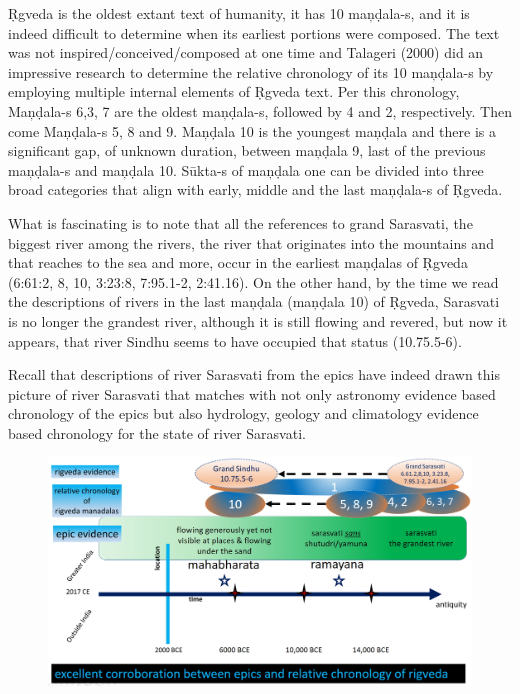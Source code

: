 Ṛgveda is the oldest extant text of humanity, it has 10 maņḍala-s, and it is indeed difficult to determine when its earliest portions were composed. The text was not inspired/conceived/composed at one time and Talageri (2000) did an impressive research to determine the relative chronology of its 10 maņḍala-s by employing multiple internal elements of Ṛgveda text. Per this chronology, Maņḍala-s 6,3, 7 are the oldest maņḍala-s, followed by 4 and 2, respectively. Then come Maņḍala-s 5, 8 and 9. Maņḍala 10 is the youngest maņḍala and there is a significant gap, of unknown duration, between maņḍala 9, last of the previous maņḍala-s and maņḍala 10. Sūkta-s of maņḍala one can be divided into three broad categories that align with early, middle and the last maņḍala-s of Ṛgveda.

What is fascinating is to note that all the references to grand Sarasvati, the biggest river among the rivers, the river that originates into the mountains and that reaches to the sea and more, occur in the earliest maņḍalas of Ṛgveda (6:61:2, 8, 10, 3:23:8, 7:95.1-2, 2:41.16). On the other hand, by the time we read the descriptions of rivers in the last maņḍala (maņḍala 10) of Ṛgveda, Sarasvati is no longer the grandest river, although it is still flowing and revered, but now it appears, that river Sindhu seems to have occupied that status (10.75.5-6).

Recall that descriptions of river Sarasvati from the epics have indeed drawn this picture of river Sarasvati that matches with not only astronomy evidence based chronology of the epics but also hydrology, geology and climatology evidence based chronology for the state of river Sarasvati.

\begin{figure}[!htbp]
\includegraphics[scale=0.21]{images/8-23.jpg}
\caption{}\label{art8-fig23}
\end{figure}


